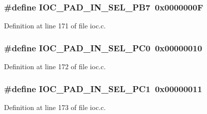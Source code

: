 \subsubsection[{\texorpdfstring{I\+O\+C\+\_\+\+P\+A\+D\+\_\+\+I\+N\+\_\+\+S\+E\+L\+\_\+\+P\+B7}{IOC_PAD_IN_SEL_PB7}}]{\setlength{\rightskip}{0pt plus 5cm}\#define I\+O\+C\+\_\+\+P\+A\+D\+\_\+\+I\+N\+\_\+\+S\+E\+L\+\_\+\+P\+B7~0x0000000F}\hypertarget{group__ioc__api_gab89bed1e8b5ca38a107d47871a51ce8c}{}\label{group__ioc__api_gab89bed1e8b5ca38a107d47871a51ce8c}


Definition at line 171 of file ioc.\+c.

\subsubsection[{\texorpdfstring{I\+O\+C\+\_\+\+P\+A\+D\+\_\+\+I\+N\+\_\+\+S\+E\+L\+\_\+\+P\+C0}{IOC_PAD_IN_SEL_PC0}}]{\setlength{\rightskip}{0pt plus 5cm}\#define I\+O\+C\+\_\+\+P\+A\+D\+\_\+\+I\+N\+\_\+\+S\+E\+L\+\_\+\+P\+C0~0x00000010}\hypertarget{group__ioc__api_ga04cce3ad317b54422c8ed689e0d38d7f}{}\label{group__ioc__api_ga04cce3ad317b54422c8ed689e0d38d7f}


Definition at line 172 of file ioc.\+c.

\subsubsection[{\texorpdfstring{I\+O\+C\+\_\+\+P\+A\+D\+\_\+\+I\+N\+\_\+\+S\+E\+L\+\_\+\+P\+C1}{IOC_PAD_IN_SEL_PC1}}]{\setlength{\rightskip}{0pt plus 5cm}\#define I\+O\+C\+\_\+\+P\+A\+D\+\_\+\+I\+N\+\_\+\+S\+E\+L\+\_\+\+P\+C1~0x00000011}\hypertarget{group__ioc__api_ga64c0b65aa571281a0aa029dd101779e0}{}\label{group__ioc__api_ga64c0b65aa571281a0aa029dd101779e0}


Definition at line 173 of file ioc.\+c.

